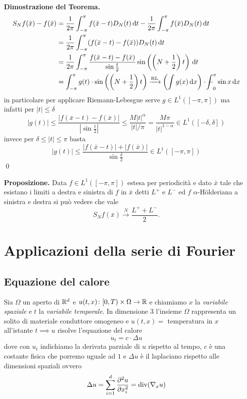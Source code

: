 \textbf{Dimostrazione del Teorema.}
$$
\begin{aligned}
	S_N f(\bar x) - f(\bar x) 
	&= \frac{1}{2\pi} \int_{-\pi}^\pi f(\bar x - t) D_N(t) \dd t - \frac{1}{2\pi} \int_{-\pi}^\pi f(\bar x) D_N(t) \dd t \\
	&= \frac{1}{2\pi} \int_{-\pi}^\pi (f(\bar x - t) - f(\bar x)) D_N(t) \dd t \\
	&= \frac{1}{2\pi} \int_{-\pi}^\pi \frac{f(\bar x - t) - f(\bar x)}{\sin \frac{t}{2}} \sin \left(\left(N + \frac{1}{2}\right) t\right) \dd t \\
	&= \int_{-\pi}^\pi g(t) \cdot \sin \left(\left(N + \frac{1}{2}\right) t\right)
	\xrightarrow{\text{RL}} \left(\int g(x) \dd x\right) \cdot \avint_0^\pi \sin x \dd x
\end{aligned}
$$
in particolare per applicare Riemann-Lebesgue serve $g \in L^1([-\pi, \pi])$ ma infatti per $|t| \leq \delta$
$$
	|g(t)| \leq \frac{|f(\bar x - t) - f(\bar x)|}{|\sin \frac{t}{2}|} \leq \frac{M |t|^\alpha}{|t| / \pi} = \frac{M \pi}{|t|^{1 - \alpha}} \in L^1([-\delta, \delta])
$$
invece per $\delta \leq |t| \leq \pi$ basta
$$
	|g(t)| \leq \frac{|f(\bar x - t)| + |f(\bar x)|}{\sin \frac{\delta}{2}} \in L^1([-\pi, \pi])
$$
\qed

\textbf{Proposizione.} Data $f \in L^1([-\pi, \pi])$ estesa per periodicità e dato $\bar x$ tale che esistano i limiti a destra e sinistra di $f$ in $\bar x$ detti $L^+$ e $L^-$ ed $f$ $\alpha$-H\"olderiana a sinistra e destra si può vedere che vale
$$
	S_N f(\bar x) \xrightarrow{N} \frac{L^+ + L^-}{2}.
$$

\chapter{Applicazioni della serie di Fourier}

\section{Equazione del calore}

Sia $\Omega$ un aperto di $\mathbb R^d$ e $u(t, x) \colon [0, T) \times \Omega \to \mathbb R$ e chiamiamo $x$ la \textit{variabile spaziale} e $t$ la \textit{variabile temporale}. In dimensione $3$ l'insieme $\Omega$ rappresenta un solito di materiale conduttore omogeneo  e $u(t, x) = $ temperatura in $x$ all'istante $t \implies u$ risolve l'equazione del calore
$$
u_t = c \cdot \Delta u
$$
dove con $u_t$ indichiamo la derivata parziale di $u$ rispetto al tempo, $c$ è una costante fisica che porremo uguale ad $1$ e $\Delta u$ è il laplaciano rispetto alle dimensioni spaziali ovvero
$$
\Delta u = \sum_{i=1}^d \frac{\partial^2 u}{\partial x_i^2} = \operatorname{div}(\nabla_x u)
$$


